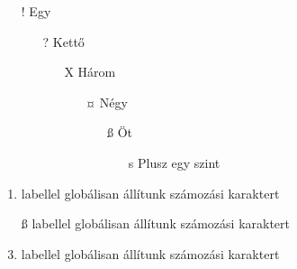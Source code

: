 \documentclass{article}
\begin{document}
\begin{enumerate}
  \item [!]Egy
  \begin{itemize}
  	\item [?]Kettő
  	\begin{itemize}
  	  	\item [X]Három
  	  	 \begin{itemize}
  	  	 \item [¤]Négy
  	  	 	\begin{itemize}
  	  			\item [ß]Öt
  	  			\begin{enumerate}
  	  				\item [s]Plusz egy szint
  	  			\end{enumerate}
  	  		\end{itemize}
  	  	 \end{itemize}
  	\end{itemize}
  \end{itemize}
\end{enumerate}

\hulipsum[1]

\begin{enumerate}[label=\alph*),ref=\theenumi.\alph*)]
\item labellel globálisan állítunk számozási karaktert
\item [ß]labellel globálisan állítunk számozási karaktert %
\item labellel globálisan állítunk számozási karaktert
\end{enumerate}
\end{document}
